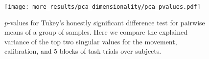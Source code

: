 \documentclass[../main.tex]{subfiles}
\begin{document}


\begin{figure}[H]
  \centering
  \texttt{[image: more\_results/pca\_dimensionality/pca\_pvalues.pdf]}
  \caption[Explained variance Tukey test]{$p$-values for Tukey's honestly significant difference test for pairwise means of a group of samples. Here we compare the explained variance of the top two singular values for the movement, calibration, and 5 blocks of task trials over subjects.}\label{fig:pca_pvalues}
\end{figure}





\end{document}

